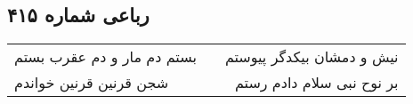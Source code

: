 \begin{center}
\section*{رباعی شماره ۴۱۵}
\label{sec:sh415}
\begin{longtable}{l p{0.5cm} r}
بستم دم مار و دم عقرب بستم
&&
نیش و دمشان بیکدگر پیوستم
\\
شجن قرنین قرنین خواندم
&&
بر نوح نبی سلام دادم رستم
\\
\end{longtable}
\end{center}
